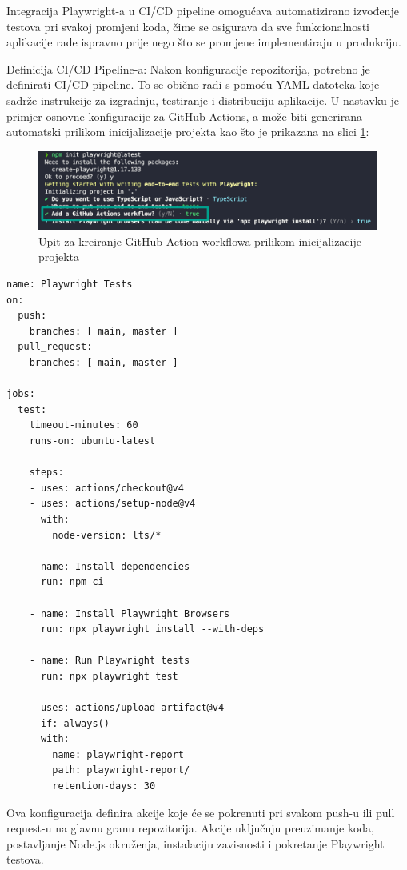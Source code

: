 
Integracija Playwright-a u CI/CD pipeline omogućava automatizirano izvođenje testova pri svakoj promjeni koda, čime se osigurava da sve funkcionalnosti aplikacije rade ispravno prije nego što se promjene implementiraju u produkciju.

Definicija CI/CD Pipeline-a: Nakon konfiguracije repozitorija, potrebno je definirati CI/CD pipeline. To se obično radi s pomoću YAML datoteka koje sadrže instrukcije za izgradnju, testiranje i distribuciju aplikacije. U nastavku je primjer osnovne konfiguracije za GitHub Actions, a može biti generirana automatski prilikom inicijalizacije projekta kao što je prikazana na slici \ref{img:ghActionPrompt}:

\begin{figure}[!h]\begin{center}
  \includegraphics[width=1\textwidth]{"img/ghActionPrompt"}
  \caption{Upit za kreiranje GitHub Action workflowa prilikom inicijalizacije projekta}\label{img:ghActionPrompt}
\end{center}\end{figure}

\begin{verbatim}
name: Playwright Tests
on:
  push:
    branches: [ main, master ]
  pull_request:
    branches: [ main, master ]

jobs:
  test:
    timeout-minutes: 60
    runs-on: ubuntu-latest

    steps:
    - uses: actions/checkout@v4
    - uses: actions/setup-node@v4
      with:
        node-version: lts/*

    - name: Install dependencies
      run: npm ci

    - name: Install Playwright Browsers
      run: npx playwright install --with-deps

    - name: Run Playwright tests
      run: npx playwright test

    - uses: actions/upload-artifact@v4
      if: always()
      with:
        name: playwright-report
        path: playwright-report/
        retention-days: 30
\end{verbatim}
Ova konfiguracija definira akcije koje će se pokrenuti pri svakom push-u ili pull request-u na glavnu granu repozitorija. Akcije uključuju preuzimanje koda, postavljanje Node.js okruženja, instalaciju zavisnosti i pokretanje Playwright testova.

